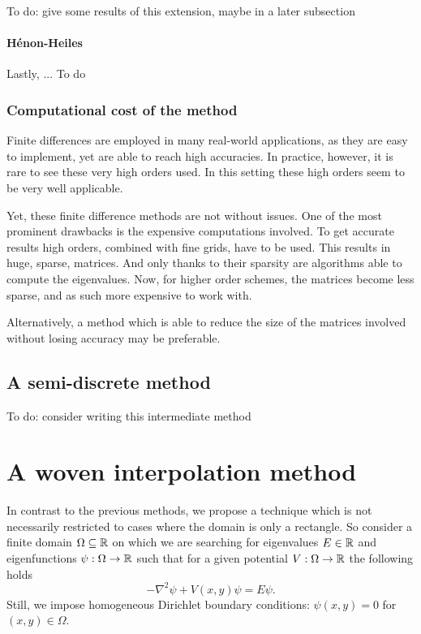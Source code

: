     {\color{red}To do: give some results of this extension, maybe in a later subsection}

\paragraph{Hénon-Heiles} Lastly, ... {\color{red}To do}


\subsubsection{Computational cost of the method}

Finite differences are employed in many real-world applications, as they are easy to implement, yet are able to reach high accuracies. In practice, however, it is rare to see these very high orders used. In this setting these high orders seem to be very well applicable.

Yet, these finite difference methods are not without issues. One of the most prominent drawbacks is the expensive computations involved. To get accurate results high orders, combined with fine grids, have to be used. This results in huge, sparse, matrices. And only thanks to their sparsity are algorithms able to compute the eigenvalues. Now, for higher order schemes, the matrices become less sparse, and as such more expensive to work with.

Alternatively, a method which is able to reduce the size of the matrices involved without losing accuracy may be preferable.

\subsection{A semi-discrete method}\label{sec:c4_semi_discrete}

{\color{red} To do: consider writing this intermediate method}

\section{A woven interpolation method}

In contrast to the previous methods, we propose a technique which is not necessarily restricted to cases where the domain is only a rectangle. So consider a finite domain $\Omega \subseteq \mathbb{R}$ on which we are searching for eigenvalues $E \in \mathbb{R}$ and eigenfunctions $\psi: \Omega \to \mathbb{R}$ such that for a given potential $V : \Omega \to \mathbb{R}$ the following holds
\begin{equation}\label{equ:c4_schrodinger_equation_new_method}
    -\nabla^2 \psi + V(x, y) \psi = E \psi\text{.}
\end{equation}
Still, we impose homogeneous Dirichlet boundary conditions: $\psi(x, y) = 0$ for $(x, y) \in \Omega$.

